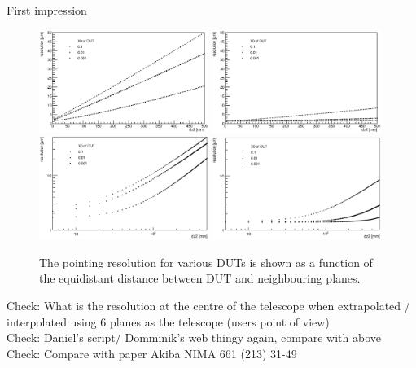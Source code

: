 First impression

\begin{figure}[tbp]
  \centering
  \includegraphics[width=0.49\textwidth]{figures/CalcResoAtDesy}
  \includegraphics[width=0.49\textwidth]{figures/CalcResoAtSPS}\\
  \includegraphics[width=0.49\textwidth]{figures/CalcResoAtDesy_loglog}
  \includegraphics[width=0.49\textwidth]{figures/CalcResoAtSPS_loglog}
  \caption[Pointing resolution for various DUTs as a function of the distance between DUT and neighbouring planes]{
  The pointing resolution for various DUTs is shown as a function of the equidistant distance between DUT and neighbouring planes.}
\label{fig:CalcResos}
\end{figure}

\noindent Check: What is the resolution at the centre of the telescope when extrapolated / interpolated using 6 planes as the telescope (users point of view)\\
Check: Daniel's script/ Domminik's web thingy again, compare with above\\
Check: Compare with paper Akiba NIMA 661 (213) 31-49
